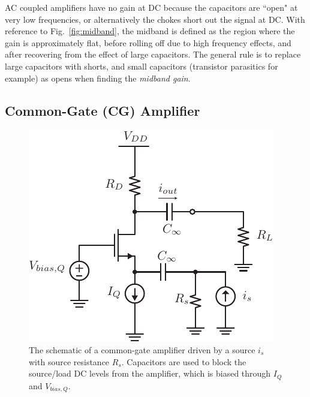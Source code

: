 AC coupled amplifiers have no gain at DC because the capacitors are ``open" at very low frequencies, or alternatively the chokes short out the signal at DC.  With reference to Fig.~\ref{fig:midband}, the midband is defined as the region where the gain is approximately flat, before rolling off due to high frequency effects, and after recovering from the effect of large capacitors. The general rule is to replace large capacitors with shorts, and small capacitors (transistor parasitics for example) as opens when finding the \emph{midband gain}. 
\subsection{Common-Gate (CG) Amplifier}
\begin{figure}[tb]
\begin{center}
\includegraphics[scale=1]{cgamp_is}
\end{center}
\caption{The schematic of a common-gate amplifier driven by a source $i_s$ with source resistance $R_s$.  Capacitors are used to block the source/load DC levels from the amplifier, which is biased through $I_Q$ and $V_{bias,Q}$.}
\label{fig:cgamp_is}
\end{figure}
 
